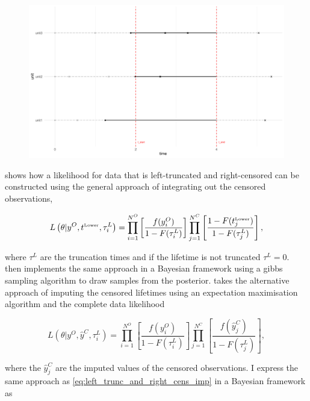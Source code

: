 \begin{figure}[h]
    \centering
    \includegraphics[width=1\textwidth]{./figures/left_truncation_w_right_censoring_example.pdf}
    \caption{}
    \label{fig:left_trunc_and_right_cens_example}
\end{figure}

\citet{hong2009} shows how a likelihood for data that is left-truncated and right-censored can be constructed using the general approach of integrating out the censored observations,

\begin{equation}
    \label{eq:left_trunc_and_right_cens_int}
    L\left(\theta|y^O, t^{\hbox{\tiny{Lower}}}, \tau^L_i\right) = \prod^{N^O}_{i = 1}\left[\frac{f(y^O_i)}{1 - F(\tau^L_i)} \right] \prod^{N^C}_{j = 1}\left[\frac{1 - F(t^{\hbox{\tiny{Lower}}}_j)}{1 - F(\tau^L_j)}\right],
\end{equation}

\noindent where $\tau^L$ are the truncation times and if the lifetime is not truncated $\tau^L = 0$. \citet{kundu2016} then implements the same approach in a Bayesian framework using a gibbs sampling algorithm to draw samples from the posterior. \citet{mitra2013} takes the alternative approach of imputing the censored lifetimes using an expectation maximisation algorithm and the complete data likelihood

\begin{equation}
    \label{eq:left_trunc_and_right_cens_imp}
    L\left(\theta|y^O, \hat{y}^C, \tau^L_i\right) = \prod^{N^O}_{i = 1}\left[\frac{f(y^O_i)}{1 - F(\tau^L_i)} \right] \prod^{N^C}_{j = 1}\left[\frac{f(\hat{y}^C_j)}{1 - F(\tau^L_j)}\right],
\end{equation}

\noindent where the $\hat{y}^C_j$ are the imputed values of the censored observations. I express the same approach as \ref{eq:left_trunc_and_right_cens_imp} in a Bayesian framework as

